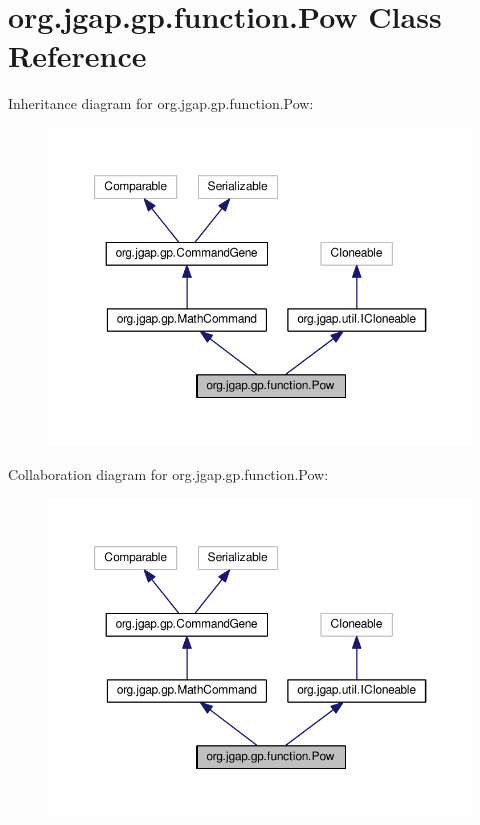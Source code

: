 \hypertarget{classorg_1_1jgap_1_1gp_1_1function_1_1_pow}{\section{org.\-jgap.\-gp.\-function.\-Pow Class Reference}
\label{classorg_1_1jgap_1_1gp_1_1function_1_1_pow}
}


Inheritance diagram for org.\-jgap.\-gp.\-function.\-Pow\-:
\nopagebreak
\begin{figure}[H]
\begin{center}
\leavevmode
\includegraphics[width=350pt]{classorg_1_1jgap_1_1gp_1_1function_1_1_pow__inherit__graph}
\end{center}
\end{figure}


Collaboration diagram for org.\-jgap.\-gp.\-function.\-Pow\-:
\nopagebreak
\begin{figure}[H]
\begin{center}
\leavevmode
\includegraphics[width=350pt]{classorg_1_1jgap_1_1gp_1_1function_1_1_pow__coll__graph}
\end{center}
\end{figure}
